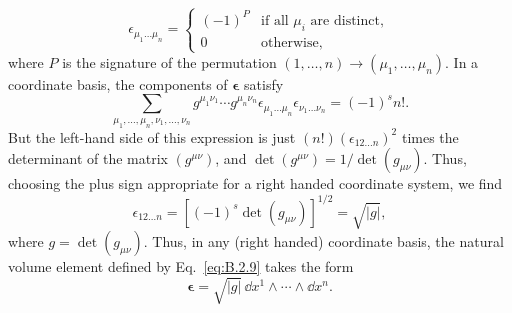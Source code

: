 \begin{equation}
  \epsilon_{\mu_1\ldots\mu_n}
  =
  \begin{cases}
    (-1)^P & \text{if all \(\mu_i\) are distinct},\\
    0 & \text{otherwise},
  \end{cases}
  \tag{B.2.14}\label{eq:B.2.14}
\end{equation}
where \(P\) is the signature of the permutation
\((1,\ldots,n)\to(\mu_1,\ldots,\mu_n)\). In a coordinate basis, the components of
\(\boldsymbol\epsilon\) satisfy
\begin{equation}
  \sum_{\mu_1,\ldots,\mu_n,\nu_1,\ldots,\nu_n}
  g^{\mu_1\nu_1}\cdots g^{\mu_n\nu_n}
  \epsilon_{\mu_1\ldots\mu_n}\epsilon_{\nu_1\ldots\nu_n}
  =(-1)^s n!.
  \tag{B.2.15}\label{eq:B.2.15}
\end{equation}
But the left-hand side of this expression is just
\((n!)(\epsilon_{12\ldots n})^2\) times the determinant of the matrix
\((g^{\mu\nu})\), and \(\det(g^{\mu\nu})=1/\det(g_{\mu\nu})\). Thus, choosing the
plus sign appropriate for a right handed coordinate system, we find
\begin{equation}
  \epsilon_{12\ldots n}
  =\left[(-1)^s\det(g_{\mu\nu})\right]^{1/2}
  =\sqrt{\lvert g\rvert},
  \tag{B.2.16}\label{eq:B.2.16}
\end{equation}
where \(g=\det(g_{\mu\nu})\). Thus, in any (right handed) coordinate basis, the
natural volume element defined by Eq.~\eqref{eq:B.2.9} takes the form
\begin{equation}
  \boldsymbol\epsilon
  =\sqrt{\lvert g\rvert}\,\dd x^1\wedge\cdots\wedge \dd x^n.
  \tag{B.2.17}\label{eq:B.2.17}
\end{equation}


